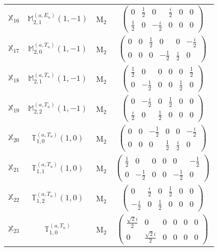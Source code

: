 \documentclass[fleqn,10pt,landscape]{article}
\begin{document}
\begin{itemize}
\begin{center}
\begin{longtable}{c|c|c|c}
$ \mathbb{X}_{16} $ & $\mathbb{M}_{2,1}^{(a,E_{u})}(1,-1)$ & M$_{2}$ & $\begin{pmatrix} 0 & \frac{1}{2} & 0 & \frac{i}{2} & 0 & 0 \\ \frac{1}{2} & 0 & - \frac{i}{2} & 0 & 0 & 0 \end{pmatrix}$ \\
$ \mathbb{X}_{17} $ & $\mathbb{M}_{2,0}^{(a,T_{u})}(1,-1)$ & M$_{2}$ & $\begin{pmatrix} 0 & 0 & \frac{1}{2} & 0 & 0 & - \frac{i}{2} \\ 0 & 0 & 0 & - \frac{1}{2} & \frac{i}{2} & 0 \end{pmatrix}$ \\
$ \mathbb{X}_{18} $ & $\mathbb{M}_{2,1}^{(a,T_{u})}(1,-1)$ & M$_{2}$ & $\begin{pmatrix} \frac{1}{2} & 0 & 0 & 0 & 0 & \frac{1}{2} \\ 0 & - \frac{1}{2} & 0 & 0 & \frac{1}{2} & 0 \end{pmatrix}$ \\
$ \mathbb{X}_{19} $ & $\mathbb{M}_{2,2}^{(a,T_{u})}(1,-1)$ & M$_{2}$ & $\begin{pmatrix} 0 & - \frac{i}{2} & 0 & \frac{1}{2} & 0 & 0 \\ \frac{i}{2} & 0 & \frac{1}{2} & 0 & 0 & 0 \end{pmatrix}$ \\
$ \mathbb{X}_{20} $ & $\mathbb{T}_{1,0}^{(a,T_{u})}(1,0)$ & M$_{2}$ & $\begin{pmatrix} 0 & 0 & - \frac{1}{2} & 0 & 0 & - \frac{i}{2} \\ 0 & 0 & 0 & \frac{1}{2} & \frac{i}{2} & 0 \end{pmatrix}$ \\
$ \mathbb{X}_{21} $ & $\mathbb{T}_{1,1}^{(a,T_{u})}(1,0)$ & M$_{2}$ & $\begin{pmatrix} \frac{1}{2} & 0 & 0 & 0 & 0 & - \frac{1}{2} \\ 0 & - \frac{1}{2} & 0 & 0 & - \frac{1}{2} & 0 \end{pmatrix}$ \\
$ \mathbb{X}_{22} $ & $\mathbb{T}_{1,2}^{(a,T_{u})}(1,0)$ & M$_{2}$ & $\begin{pmatrix} 0 & \frac{i}{2} & 0 & \frac{1}{2} & 0 & 0 \\ - \frac{i}{2} & 0 & \frac{1}{2} & 0 & 0 & 0 \end{pmatrix}$ \\
$ \mathbb{X}_{23} $ & $\mathbb{T}_{1,0}^{(a,T_{u})}$ & M$_{2}$ & $\begin{pmatrix} \frac{\sqrt{2} i}{2} & 0 & 0 & 0 & 0 & 0 \\ 0 & \frac{\sqrt{2} i}{2} & 0 & 0 & 0 & 0 \end{pmatrix}$ \\

\end{longtable}
\end{center}
\end{itemize}
\end{document}
